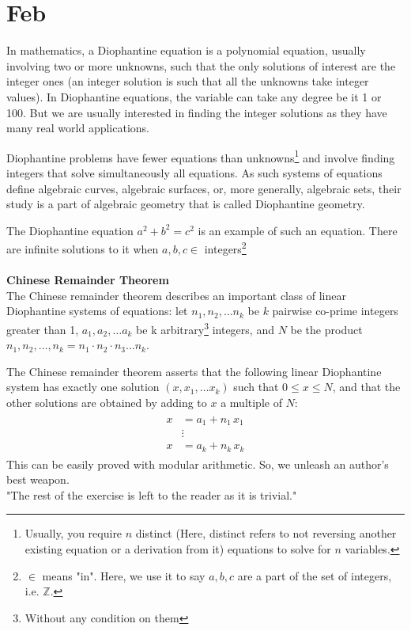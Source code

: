 \section{Feb}
\newpage
\begin{mathbox}{}
{In mathematics, a Diophantine equation is a polynomial equation, usually involving two or more unknowns, such that the only solutions of interest are the integer ones (an integer solution is such that all the unknowns take integer values). In Diophantine equations, the variable can take any degree be it 1 or 100. But we are usually interested in finding the integer solutions as they have many real world applications.

Diophantine problems have fewer equations than unknowns\footnote{Usually, you require $n$ distinct (Here, distinct refers to not reversing another existing equation or a derivation from it) equations to solve for $n$ variables.} and involve finding integers that solve simultaneously all equations. As such systems of equations define algebraic curves, algebraic surfaces, or, more generally, algebraic sets, their study is a part of algebraic geometry that is called Diophantine geometry.

The Diophantine equation $a^2 + b^2 = c^2$ is an example of such an equation. There are infinite solutions to it when $a,b,c \in$ integers\footnote{$\in$ means "in". Here, we use it to say $a,b,c$ are a part of the set of integers, i.e. $\mathbb{Z}$.}
\\\\
\textbf{Chinese Remainder Theorem}\\
The Chinese remainder theorem describes an important class of linear Diophantine systems of equations: let $n_1, n_2, \dots n_k$ be $k$ pairwise co-prime integers greater than 1, $a_1, a_2, \dots a_k$ be k arbitrary\footnote{Without any condition on them} integers, and $N$ be the product $n_1, n_2, \dots, n_k = n_1 \cdot n_2 \cdot n_3 \dots n_k$. 

The Chinese remainder theorem asserts that the following linear Diophantine system has exactly one solution $(x, x_1, \dots x_k)$ such that $0 \leq x \leq N$, and that the other solutions are obtained by adding to $x$ a multiple of $N$:
\begin{align*}
    {\displaystyle {\begin{aligned}x&=a_{1}+n_{1}\,x_{1}\\&\vdots \\x&=a_{k}+n_{k}\,x_{k}\end{aligned}}}
\end{align*}
This can be easily proved with modular arithmetic. So, we unleash an author's best weapon.\\"The rest of the exercise is left to the reader as it is {trivial}."}
\end{mathbox}
